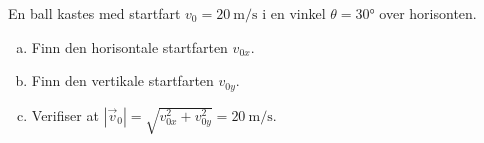 %
En ball kastes med startfart $v_0 = \SI{20}{\metre\per\second}$ i en vinkel $\theta = 30°$ over horisonten.
\begin{enumerate}[a)]
    \item Finn den horisontale startfarten $v_{0x}$.
    \item Finn den vertikale startfarten $v_{0y}$.
    \item Verifiser at $|\vec{v}_0| = \sqrt{v_{0x}^2 + v_{0y}^2} = \SI{20}{\metre\per\second}$.
\end{enumerate}
